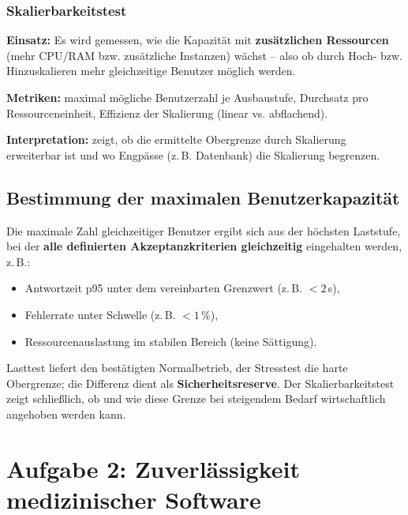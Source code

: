 \documentclass[
	fontsize=12pt,          %
	paper=a4,               %
	numbers=noenddot,       %
	listof=totoc,           %
	listof=entryprefix,     %
	listof=nochaptergap,    %
	bibliography=totoc,     %
	parskip=half,           %
	openany                 %
]{scrbook}
\begin{document}
\subsection*{Skalierbarkeitstest}

\textbf{Einsatz:} Es wird gemessen, wie die Kapazität mit \textbf{zusätzlichen
Ressourcen} (mehr CPU/RAM bzw. zusätzliche Instanzen) wächst -- also ob durch
Hoch- bzw. Hinzuskalieren mehr gleichzeitige Benutzer möglich werden.

\textbf{Metriken:} maximal mögliche Benutzerzahl je Ausbaustufe, Durchsatz pro
Ressourceneinheit, Effizienz der Skalierung (linear vs. abflachend).

\textbf{Interpretation:} zeigt, ob die ermittelte Obergrenze durch Skalierung
erweiterbar ist und wo Engpässe (z.\,B. Datenbank) die Skalierung begrenzen.

\section*{Bestimmung der maximalen Benutzerkapazität}

Die maximale Zahl gleichzeitiger Benutzer ergibt sich aus der höchsten Laststufe,
bei der \textbf{alle definierten Akzeptanzkriterien gleichzeitig} eingehalten
werden, z.\,B.:

\begin{itemize}
	\item Antwortzeit p95 unter dem vereinbarten Grenzwert (z.\,B. $< 2$\,s),
	\item Fehlerrate unter Schwelle (z.\,B. $< 1\,\%$),
	\item Ressourcenauslastung im stabilen Bereich (keine Sättigung).
\end{itemize}

Lasttest liefert den bestätigten Normalbetrieb, der Stresstest die harte
Obergrenze; die Differenz dient als \textbf{Sicherheitsreserve}.
Der Skalierbarkeitstest zeigt schließlich, ob und wie diese Grenze bei steigendem
Bedarf wirtschaftlich angehoben werden kann.



\chapter*{Aufgabe 2: Zuverlässigkeit medizinischer Software}
\end{document}
